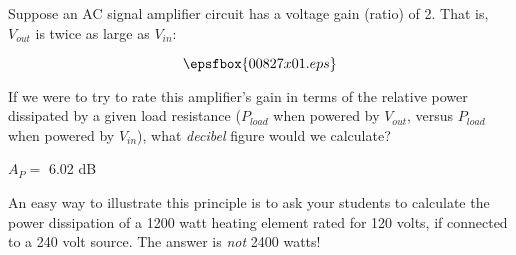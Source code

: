 

Suppose an AC signal amplifier circuit has a voltage gain (ratio) of 2.  That is, $V_{out}$ is twice as large as $V_{in}$:

$$\epsfbox{00827x01.eps}$$

If we were to try to rate this amplifier's gain in terms of the relative power dissipated by a given load resistance ($P_{load}$ when powered by $V_{out}$, versus $P_{load}$ when powered by $V_{in}$), what {\it decibel} figure would we calculate?







$A_P =$ 6.02 dB







An easy way to illustrate this principle is to ask your students to calculate the power dissipation of a 1200 watt heating element rated for 120 volts, if connected to a 240 volt source.  The answer is {\it not} 2400 watts!





